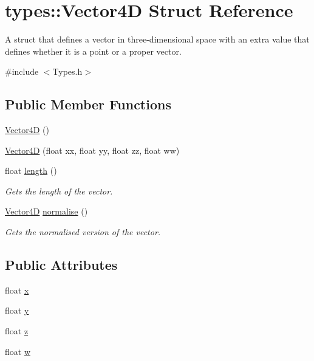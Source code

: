 \hypertarget{structtypes_1_1_vector4_d}{}\section{types\+:\+:Vector4\+D Struct Reference}
\label{structtypes_1_1_vector4_d}


A struct that defines a vector in three-\/dimensional space with an extra value that defines whether it is a point or a proper vector.  




{\ttfamily \#include $<$Types.\+h$>$}

\subsection*{Public Member Functions}
\begin{DoxyCompactItemize}
\item 
\hyperlink{structtypes_1_1_vector4_d_a0df265dd69de197b5259c7bb3a5d4fab}{Vector4\+D} ()
\item 
\hyperlink{structtypes_1_1_vector4_d_a8b7d063aeb822272b6c8ff6828735c2c}{Vector4\+D} (float xx, float yy, float zz, float ww)
\item 
float \hyperlink{structtypes_1_1_vector4_d_a9e935c0af1c2779e6ad6cf64386076ba}{length} ()
\begin{DoxyCompactList}\small\item\em Gets the length of the vector. \end{DoxyCompactList}\item 
\hyperlink{structtypes_1_1_vector4_d}{Vector4\+D} \hyperlink{structtypes_1_1_vector4_d_aa5b5db5d0c898a79db9230bc6c8d7c24}{normalise} ()
\begin{DoxyCompactList}\small\item\em Gets the normalised version of the vector. \end{DoxyCompactList}\end{DoxyCompactItemize}
\subsection*{Public Attributes}
\begin{DoxyCompactItemize}
\item 
float \hyperlink{structtypes_1_1_vector4_d_a00b1b79bf63dc9b91d3100bbceb8b061}{x}
\item 
float \hyperlink{structtypes_1_1_vector4_d_ae3bf75e7f1e4430aecab11f181c53b61}{y}
\item 
float \hyperlink{structtypes_1_1_vector4_d_a6384f3ff311fbdd2ed4e88d6ec548130}{z}
\item 
float \hyperlink{structtypes_1_1_vector4_d_a701a06571f4bf043defa2d19d086dcc1}{w}
\end{DoxyCompactItemize}



